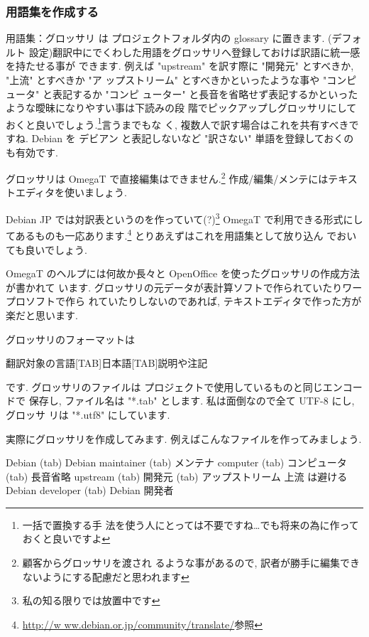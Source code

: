 \documentclass[mingoth,a4paper]{jsarticle}
\begin{document}
\subsubsection{用語集を作成する}

用語集：グロッサリ は プロジェクトフォルダ内の glossary に置きます. (デフォルト
設定)翻訳中にでくわした用語をグロッサリへ登録しておけば訳語に統一感を持たせる事が
できます. 例えば "upstream" を訳す際に "開発元" とすべきか, "上流" とすべきか "ア
ップストリーム" とすべきかといったような事や "コンピュータ" と表記するか "コンピ
ューター" と長音を省略せず表記するかといったような曖昧になりやすい事は下読みの段
階でピックアップしグロッサリにしておくと良いでしょう.\footnote{一括で置換する手
法を使う人にとっては不要ですね…でも将来の為に作っておくと良いですよ}言うまでもな
く, 複数人で訳す場合はこれを共有すべきですね. Debian を デビアン と表記しないなど
"訳さない" 単語を登録しておくのも有効です.

グロッサリは OmegaT で直接編集はできません.\footnote{顧客からグロッサリを渡され
るような事があるので, 訳者が勝手に編集できないようにする配慮だと思われます}
作成/編集/メンテにはテキストエディタを使いましょう.

Debian JP では対訳表というのを作っていて(?)\footnote{私の知る限りでは放置中です} 
OmegaT で利用できる形式にしてあるものも一応あります.\footnote{\url{http://w
ww.debian.or.jp/community/translate/}参照} とりあえずはこれを用語集として放り込ん
でおいても良いでしょう.

OmegaT のヘルプには何故か長々と OpenOffice を使ったグロッサリの作成方法が書かれて
います. グロッサリの元データが表計算ソフトで作られていたりワープロソフトで作ら
れていたりしないのであれば, テキストエディタで作った方が楽だと思います.

グロッサリのフォーマットは
\begin{commandline}
翻訳対象の言語[TAB]日本語[TAB]説明や注記
\end{commandline}
です. グロッサリのファイルは プロジェクトで使用しているものと同じエンコードで
保存し, ファイル名は "*.tab" とします. 私は面倒なので全て UTF-8 にし, グロッサ
リは "*.utf8" にしています.

実際にグロッサリを作成してみます. 例えばこんなファイルを作ってみましょう.

\begin{commandline}
Debian (tab) Debian
maintainer (tab) メンテナ
computer (tab) コンピュータ (tab) 長音省略
upstream (tab) 開発元 (tab) アップストリーム 上流 は避ける	
Debian developer (tab) Debian 開発者
\end{commandline}
\end{document}
